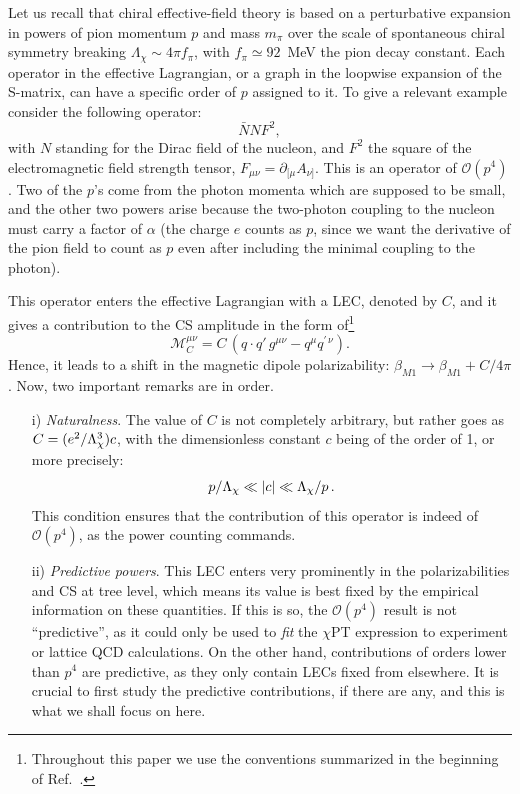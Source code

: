 \documentclass[11pt,preprint,tightenlines,
showpacs,preprintnumbers,amsmath,amssymb,superscriptaddress,a4paper,nofootinbib]{revtex4-1}
\def\beq{\begin{equation}}
\def\eeq{\end{equation}}
\def\al{\alpha}
\def\be{\beta}
\def\pa{\partial}
\def\pa{\partial}
\begin{document}
Let us recall that  chiral effective-field theory is based on 
a perturbative expansion in powers of pion momentum $p$ and mass $m_\pi$ over the scale of spontaneous chiral symmetry breaking ${\Lambda_\chi\sim 4\pi f_\pi}$, with
$f_\pi\simeq 92$~MeV the pion decay constant. Each operator in the effective Lagrangian, or a
graph in the loopwise expansion of the S-matrix, can have a specific order of
$p$ assigned to it.
To give a relevant example consider the following operator: 
\beq
\bar N N F^2,
\eeq
with $N$ standing for the Dirac field
of the nucleon, and $F^2$ the square of the electromagnetic field strength tensor, $F_{\mu\nu}=\pa_{[\mu}A_{\nu]}$. This is an operator of $\mathcal{O}(p^4)$. Two of the $p$'s come from the
photon momenta which are supposed to be small, and the other two powers arise because the two-photon
coupling to the nucleon must carry a factor of $\al$ (the charge $e$ counts as $p$, since we want
the derivative of the pion field to count as $p$ even after including the minimal coupling to the photon).

This operator enters the effective Lagrangian with a LEC, denoted by $C$,
and it gives a contribution to the CS amplitude in the form of\footnote{
Throughout this paper we use the conventions summarized in the beginning of Ref.~\cite{Hagelstein:2015egb}.}
\beq 
\mathcal{M}^{\mu\nu}_C = C \, (q\cdot q' \, g^{\mu\nu} - q^\mu q^{\prime\,\nu}).
\eeq 
Hence, it leads to a shift in the magnetic dipole polarizability: $\be_{M1}\to \be_{M1}+C/4\pi$.
Now, two important remarks are in order.
\begin{itemize}
\item[i)] {\em Naturalness}. The value of $C$ is not completely arbitrary, but rather goes as 
${C= (e^2/{\Lambda}_\chi^3) c} $, with the dimensionless constant $c$ being of the order of 1, or more precisely:
\beq 
p/\La_\chi \ll |c|\ll \La_\chi/p\,.
\eeq 
This condition ensures that the contribution  of this operator is indeed 
of $\mathcal{O}(p^4)$, as the power counting commands.
\item[ii)] {\em Predictive powers}.
This LEC enters very prominently in the polarizabilities and CS  at tree level,
which means its value is best fixed by the empirical information on these quantities. 
If this is so, the $\mathcal{O}(p^4)$ result is not ``predictive'', as it could only be used to {\em fit} 
the $\chi$PT expression to experiment or lattice QCD calculations. On the other hand, contributions
of orders lower than $p^4$ are predictive, as they only contain LECs fixed from elsewhere.
It is crucial to first study the predictive contributions, if there are any, and this is what we shall
focus on here.
\end{itemize}
\end{document}
